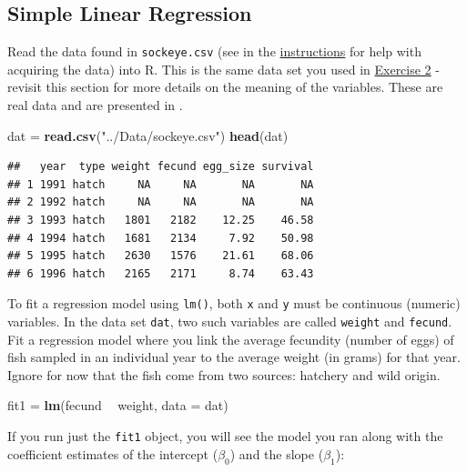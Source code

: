 \documentclass[]{book}
\newenvironment{Shaded}{\begin{snugshade}}{\end{snugshade}}
\newcommand{\KeywordTok}[1]{\textcolor[rgb]{0.13,0.29,0.53}{\textbf{#1}}}
\newcommand{\DataTypeTok}[1]{\textcolor[rgb]{0.13,0.29,0.53}{#1}}
\newcommand{\StringTok}[1]{\textcolor[rgb]{0.31,0.60,0.02}{#1}}
\newcommand{\OperatorTok}[1]{\textcolor[rgb]{0.81,0.36,0.00}{\textbf{#1}}}
\newcommand{\NormalTok}[1]{#1}
\theoremstyle{definition}
\theoremstyle{definition}
\theoremstyle{definition}
\theoremstyle{remark}
\begin{document}
\subsection{Simple Linear Regression}\label{regression}

Read the data found in \texttt{sockeye.csv} (see in the
\protect\hyperlink{data-sets}{instructions} for help with acquiring the
data) into R. This is the same data set you used in
\protect\hyperlink{ex2}{Exercise 2} - revisit this section for more
details on the meaning of the variables. These are real data and are
presented in \citet{sockeye-cite}.

\begin{Shaded}
\begin{Highlighting}[]
\NormalTok{dat =}\StringTok{ }\KeywordTok{read.csv}\NormalTok{(}\StringTok{"../Data/sockeye.csv"}\NormalTok{)}
\KeywordTok{head}\NormalTok{(dat)}
\end{Highlighting}
\end{Shaded}

\begin{verbatim}
##   year  type weight fecund egg_size survival
## 1 1991 hatch     NA     NA       NA       NA
## 2 1992 hatch     NA     NA       NA       NA
## 3 1993 hatch   1801   2182    12.25    46.58
## 4 1994 hatch   1681   2134     7.92    50.98
## 5 1995 hatch   2630   1576    21.61    68.06
## 6 1996 hatch   2165   2171     8.74    63.43
\end{verbatim}

To fit a regression model using \texttt{lm()}, both \texttt{x} and
\texttt{y} must be continuous (numeric) variables. In the data set
\texttt{dat}, two such variables are called \texttt{weight} and
\texttt{fecund}. Fit a regression model where you link the average
fecundity (number of eggs) of fish sampled in an individual year to the
average weight (in grams) for that year. Ignore for now that the fish
come from two sources: hatchery and wild origin.

\begin{Shaded}
\begin{Highlighting}[]
\NormalTok{fit1 =}\StringTok{ }\KeywordTok{lm}\NormalTok{(fecund }\OperatorTok{~}\StringTok{ }\NormalTok{weight, }\DataTypeTok{data =}\NormalTok{ dat)}
\end{Highlighting}
\end{Shaded}

If you run just the \texttt{fit1} object, you will see the model you ran
along with the coefficient estimates of the intercept (\(\beta_0\)) and
the slope (\(\beta_1\)):
\end{document}
